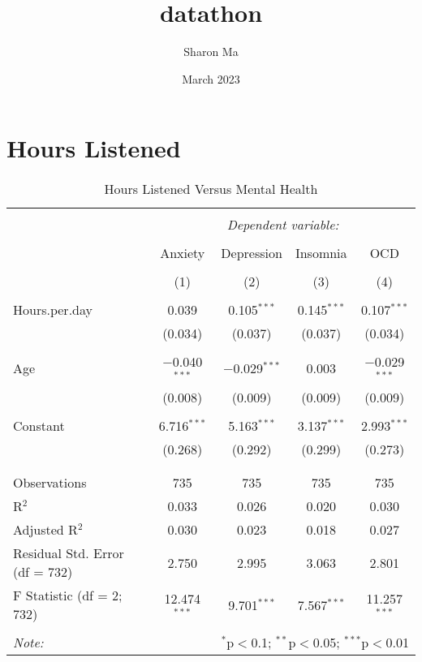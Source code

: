 \documentclass{article}
\title{datathon}
\author{Sharon Ma}
\date{March 2023}
\begin{document}
\section{Hours Listened}

\begin{table}[!htbp] \centering 
  \caption{Hours Listened Versus Mental Health} 
  \label{} 
\begin{tabular}{@{\extracolsep{5pt}}lcccc} 
\\[-1.8ex]\hline 
\hline \\[-1.8ex] 
 & \multicolumn{4}{c}{\textit{Dependent variable:}} \\ 
\cline{2-5} 
\\[-1.8ex] & Anxiety & Depression & Insomnia & OCD \\ 
\\[-1.8ex] & (1) & (2) & (3) & (4)\\ 
\hline \\[-1.8ex] 
 Hours.per.day & 0.039 & 0.105$^{***}$ & 0.145$^{***}$ & 0.107$^{***}$ \\ 
  & (0.034) & (0.037) & (0.037) & (0.034) \\ 
  & & & & \\ 
 Age & $-$0.040$^{***}$ & $-$0.029$^{***}$ & 0.003 & $-$0.029$^{***}$ \\ 
  & (0.008) & (0.009) & (0.009) & (0.009) \\ 
  & & & & \\ 
 Constant & 6.716$^{***}$ & 5.163$^{***}$ & 3.137$^{***}$ & 2.993$^{***}$ \\ 
  & (0.268) & (0.292) & (0.299) & (0.273) \\ 
  & & & & \\ 
\hline \\[-1.8ex] 
Observations & 735 & 735 & 735 & 735 \\ 
R$^{2}$ & 0.033 & 0.026 & 0.020 & 0.030 \\ 
Adjusted R$^{2}$ & 0.030 & 0.023 & 0.018 & 0.027 \\ 
Residual Std. Error (df = 732) & 2.750 & 2.995 & 3.063 & 2.801 \\ 
F Statistic (df = 2; 732) & 12.474$^{***}$ & 9.701$^{***}$ & 7.567$^{***}$ & 11.257$^{***}$ \\ 
\hline 
\hline \\[-1.8ex] 
\textit{Note:}  & \multicolumn{4}{r}{$^{*}$p$<$0.1; $^{**}$p$<$0.05; $^{***}$p$<$0.01} \\ 
\end{tabular} 
\end{table}
\end{document}
